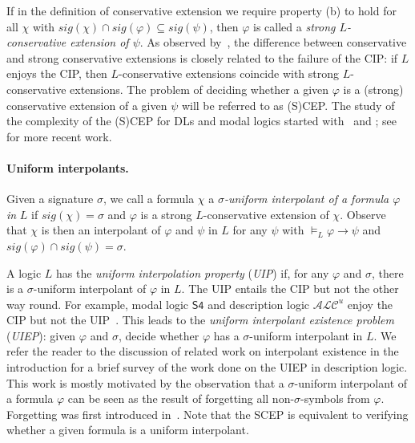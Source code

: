 \documentclass{lmcs} %
\theoremstyle{plain}\newtheorem{satz}[thm]{Satz} %
\newcommand{\nb}[1]{\textcolor{red}{\bf!}%
	\marginpar[\parbox{15mm}{\raggedleft\scriptsize\textcolor{red}{#1}}]%
	{\parbox{15mm}{\raggedright\scriptsize\textcolor{red}{#1}}}}
\newcommand{\sig}{\mathit{sig}}
\begin{document}
If in the definition of conservative extension we require property (b) to hold for all $\chi$ with $\sig(\chi) \cap \sig(\varphi) \subseteq \sig(\psi)$, then $\varphi$ is called a \emph{strong $L$-conservative extension of $\psi$}. As observed by~\cite{DBLP:conf/icalp/JungLM0W17}, the difference between conservative and strong conservative extensions is closely related to the failure of the CIP: if $L$ enjoys the CIP, then $L$-conservative extensions coincide with strong  $L$-conservative extensions. The problem of deciding whether a given $\varphi$ is a (strong) conservative extension of a given $\psi$ will be referred to as (S)CEP. The study of the complexity of the (S)CEP for DLs and modal logics started with~\cite{DBLP:conf/kr/GhilardiLW06} and \cite{DBLP:conf/aiml/GhilardiLWZ06}; see~\cite{DBLP:journals/ai/BotoevaLRWZ19,DBLP:conf/kr/JungLM22} for more recent work.


\paragraph{Uniform interpolants.} Given a signature $\sigma$, we call a formula $\chi$ a \emph{$\sigma$-uniform interpolant of a formula $\varphi$ in} $L$ if $\sig(\chi)=\sigma$ and $\varphi$ is a strong $L$-conservative extension of $\chi$. Observe that $\chi$ is then an interpolant of $\varphi$ and $\psi$ in $L$ for any $\psi$ with $\models_{L}\varphi \rightarrow \psi$ and $\sig(\varphi) \cap \sig(\psi) = \sigma$. 
	
A logic $L$ has the \emph{uniform interpolation property} (\emph{UIP}) if, for any $\varphi$ and $\sigma$, there is a $\sigma$-uniform interpolant of $\varphi$ in $L$. The UIP entails the CIP  but not the other way round. For example, modal logic $\mathsf{S4}$ and description logic $\mathcal{ALC}^{u}$ enjoy the CIP but not the UIP~\cite{DBLP:journals/sLogica/GhilardiZ95,DBLP:conf/ijcai/LutzW11}.
This leads to the \emph{uniform interpolant existence problem} (\emph{UIEP}):  given $\varphi$ and $\sigma$, decide whether $\varphi$ has a $\sigma$-uniform interpolant in $L$. We refer the reader to the discussion of related work on interpolant existence in the introduction for a brief survey of the work done on the UIEP in description logic. This work is mostly motivated by the observation that a $\sigma$-uniform interpolant of a formula $\varphi$ can be seen as the result of forgetting all non-$\sigma$-symbols from $\varphi$. Forgetting was first introduced in~\cite{Lin94a}. 
%
Note that the SCEP is equivalent to verifying whether a given formula is a uniform interpolant.
\end{document}
